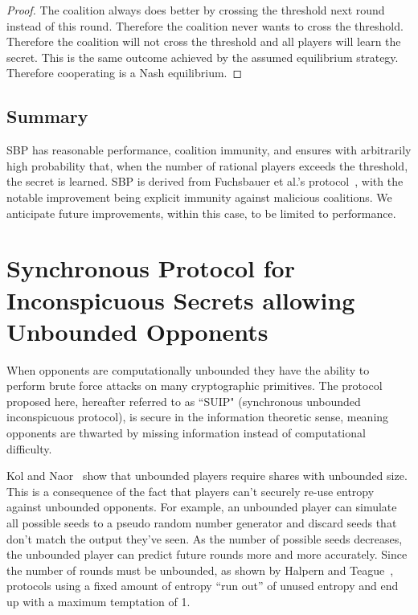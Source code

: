 \documentclass[12pt]{dalcsthesis}
\begin{document}
\begin{proof}
The coalition always does better by crossing the threshold next round instead of this round. Therefore the coalition never wants to cross the threshold. Therefore the coalition will not cross the threshold and all players will learn the secret. This is the same outcome achieved by the assumed equilibrium strategy. Therefore cooperating is a Nash equilibrium.
\end{proof}


\subsection{Summary}

SBP has reasonable performance, coalition immunity, and ensures with arbitrarily high probability that, when the number of rational players exceeds the threshold, the secret is learned. SBP is derived from Fuchsbauer et al.'s protocol~\cite{fuch10}, with the notable improvement being explicit immunity against malicious coalitions. We anticipate future improvements, within this case, to be limited to performance.



\section{Synchronous Protocol for Inconspicuous Secrets allowing Unbounded Opponents}

When opponents are computationally unbounded they have the ability to perform brute force attacks on many cryptographic primitives. The protocol proposed here, hereafter referred to as ``SUIP" (synchronous unbounded inconspicuous protocol), is secure in the information theoretic sense, meaning opponents are thwarted by missing information instead of computational difficulty.

Kol and Naor~\cite{kol08} show that unbounded players require shares with unbounded size. This is a consequence of the fact that players can't securely re-use entropy against unbounded opponents. For example, an unbounded player can simulate all possible seeds to a pseudo random number generator and discard seeds that don't match the output they've seen. As the number of possible seeds decreases, the unbounded player can predict future rounds more and more accurately. Since the number of rounds must be unbounded, as shown by Halpern and Teague~\cite{halpern04}, protocols using a fixed amount of entropy ``run out'' of unused entropy and end up with a maximum temptation of 1.
\end{document}
